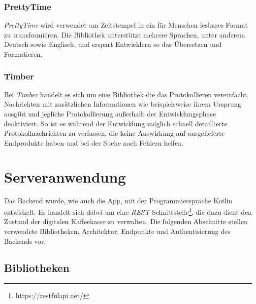 \documentclass[a4paper, 11pt]{article}
\begin{document}
\subsubsection{PrettyTime}
\label{subsubsec:app:bibs:prettytime}

\textit{PrettyTime} wird verwendet um Zeitstempel in ein für Menschen lesbares Format zu transformieren.
Die Bibliothek unterstützt mehrere Sprachen, unter anderem Deutsch sowie Englisch, und erspart Entwicklern so das Übersetzen und Formatieren.

\subsubsection{Timber}
\label{subsubsec:app:bibs:timber}

Bei \textit{Timber} handelt es sich um eine Bibliothek die das Protokollieren vereinfacht, Nachrichten mit zusätzlichen Informationen wie beispielsweise ihrem Ursprung ausgibt und jegliche Protokollierung außerhalb der Entwicklungsphase deaktiviert.
So ist es während der Entwicklung möglich schnell detaillierte Protokollnachrichten zu verfassen, die keine Auswirkung auf ausgelieferte Endprodukte haben und bei der Suche nach Fehlern helfen.

\section{Serveranwendung}
\label{sec:backend}

Das Backend wurde, wie auch die App, mit der Programmiersprache Kotlin entwickelt.
Es handelt sich dabei um eine \textit{REST}-Schnittstelle\footnote{https://restfulapi.net/}, die dazu dient den Zustand der digitalen Kaffeekasse zu verwalten.
Die folgenden Abschnitte stellen verwendete Bibliotheken, Architektur, Endpunkte und Authentisierung des Backends vor.

\subsection{Bibliotheken}
\label{subsec:backend:bibs}
\end{document}
